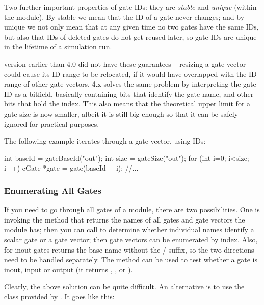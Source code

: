 Two further important properties of gate IDs: they are \textit{stable}
and \textit{unique} (within the module). By stable we mean that the ID
of a gate never changes; and by unique we not only mean that at any
given time no two gates have the same IDs, but also that IDs of deleted
gates do not get reused later, so gate IDs are unique in the lifetime
of a simulation run.

\begin{note}
    {\opp} version earlier than 4.0 did not have these guarantees -- resizing
    a gate vector could cause its ID range to be relocated, if it
    would have overlapped with the ID range of other gate vectors.
    {\opp} 4.x solves the same problem by interpreting the gate ID
    as a bitfield, basically containing bits that identify the gate name,
    and other bits that hold the index. This also means that the theoretical
    upper limit for a gate size is now smaller, albeit it is still
    big enough so that it can be safely ignored for practical purposes.
\end{note}

The following example iterates through a gate vector, using IDs:

\begin{cpp}
int baseId = gateBaseId("out");
int size = gateSize("out");
for (int i=0; i<size; i++) {
    cGate *gate = gate(baseId + i);
    //...
}
\end{cpp}


\subsubsection{Enumerating All Gates}

If you need to go through all gates of a module, there are
two possibilities. One is invoking the  method
that returns the names of all gates and gate vectors the module
has; then you can call  to determine
whether individual names identify a scalar gate or a gate vector;
then gate vectors can be enumerated by index. Also, for inout
gates  returns the base name without the
/ suffix, so the two directions
need to be handled separately. The  method
can be used to test whether a gate is inout, input or output
(it returns , , or
).

Clearly, the above solution can be quite difficult. An alternative is to use
the  class provided by .
It goes like this:

